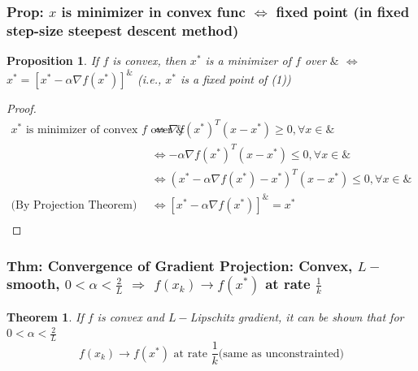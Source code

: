 \documentclass[11pt,a4paper]{article}
\newtheorem{theorem}{Theorem}
\newtheorem{proposition}{Proposition}
\begin{document}
\subsubsection{Prop: $x$ is minimizer in convex func $\Leftrightarrow$ fixed point (in fixed step-size steepest descent method)}
\begin{proposition}
    If $f$ is convex, then $x^*$ is a minimizer of $f$ over $\&$ $\Leftrightarrow$ $x^*=[x^*-\alpha \nabla f(x^*)]^\&$ (i.e., $x^*$ is a fixed point of (1))
\end{proposition}
\begin{proof}
    \begin{equation}
        \begin{aligned}
            \text{$x^*$ is minimizer of convex $f$ over $\&$} &\Leftrightarrow \nabla f(x^*)^T(x-x^*)\geq 0,\forall x\in \&\\
            &\Leftrightarrow -\alpha\nabla f(x^*)^T(x-x^*)\leq 0,\forall x\in \&\\
            &\Leftrightarrow (x^*-\alpha\nabla f(x^*)-x^*)^T(x-x^*)\leq 0,\forall x\in \&\\
            \text{(By Projection Theorem)}&\Leftrightarrow [x^*-\alpha\nabla f(x^*)]^\&=x^*\\
        \end{aligned}
        \nonumber
    \end{equation}
\end{proof}

\subsubsection{Thm: Convergence of Gradient Projection: Convex, $L-$smooth, $0<\alpha<\frac{2}{L}$ $\Rightarrow$ $f(x_k)\rightarrow f(x^*)$ at rate $\frac{1}{k}$}
\begin{theorem}
    If $f$ is convex and $L-$Lipschitz gradient, it can be shown that for $0<\alpha<\frac{2}{L}$
    $$f(x_k)\rightarrow f(x^*)\text{ at rate }\frac{1}{k}\text{(same as unconstrainted)}$$
\end{theorem}
\end{document}
